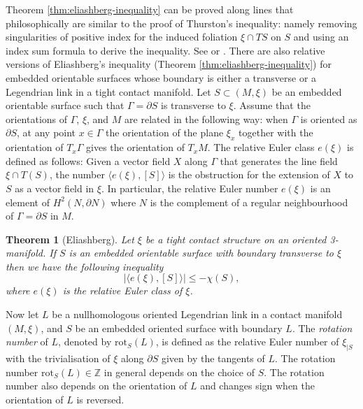 \documentclass[11pt]{amsart}
\newtheorem{thm}{Theorem}[section]
\theoremstyle{remark}
\theoremstyle{definition}
\begin{document}
	Theorem \ref{thm:eliashberg-inequality} can be proved along lines that philosophically are similar to the proof of Thurston's inequality: namely removing singularities of positive index for the induced foliation $\xi \cap TS$ on $S$ and using an index sum formula to derive the inequality. See \cite{ozbagci-stipsicz} or \cite{geiges-book}.	There are also relative versions of Eliashberg's inequality (Theorem \ref{thm:eliashberg-inequality}) for embedded orientable surfaces whose boundary is either a transverse or a Legendrian link in a tight contact manifold. Let $S \subset (M, \xi)$ be an embedded orientable surface such that $\Gamma = \partial S$ is transverse to $\xi$. Assume that the orientations of $\Gamma$, $\xi$, and $M$ are related in the following way: when $\Gamma$ is oriented as $\partial S$, at any point $x \in \Gamma$ the orientation of the plane $\xi_x$ together with the orientation of $T_x\Gamma$ gives the orientation of $T_xM$. The relative Euler class $e(\xi)$ is defined as follows: Given a vector field $X$ along $\Gamma$ that generates the line field $\xi \cap T(S)$, the number $\langle e(\xi) , [S] \rangle$ is the obstruction for the extension of $X$ to $S$ as a vector field in $\xi$. In particular, the relative Euler number $e(\xi)$ is an element of $H^2(N , \partial N)$ where $N$ is the complement of a regular neighbourhood of $\Gamma = \partial S$ in $M$. 
	
	\begin{thm}[Eliashberg]
		Let $\xi$ be a tight contact structure on an oriented 3-manifold. If $S$ is an embedded orientable surface with boundary transverse to $\xi$ then we have the following inequality 
		\[ | \langle e(\xi) , [S] \rangle | \leq - \chi(S), \]
		where $e(\xi)$ is the relative Euler class of $\xi$.
		\label{thm:eliashberg-transverse knot}
	\end{thm}

	Now let $L$ be a nullhomologous oriented Legendrian link in a contact manifold $(M, \xi)$, and $S$ be an embedded oriented surface with boundary $L$. The \emph{rotation number} of $L$, denoted by $\mathrm{rot}_S(L)$, is defined as the relative Euler number of $\xi_{|S}$ with the trivialisation of $\xi$ along $\partial S$ given by the tangents of $L$. The rotation number $\mathrm{rot}_S(L) \in \mathbb{Z}$ in general depends on the choice of $S$. The rotation number also depends on the orientation of $L$ and changes sign when the orientation of $L$ is reversed. 
	
\end{document}
